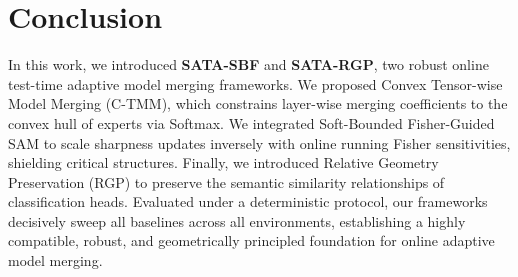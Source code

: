 \documentclass{article}
\begin{document}
\section{Conclusion}
\label{sec:conclusion}
In this work, we introduced \textbf{SATA-SBF} and \textbf{SATA-RGP}, two robust online test-time adaptive model merging frameworks. We proposed Convex Tensor-wise Model Merging (C-TMM), which constrains layer-wise merging coefficients to the convex hull of experts via Softmax. We integrated Soft-Bounded Fisher-Guided SAM to scale sharpness updates inversely with online running Fisher sensitivities, shielding critical structures. Finally, we introduced Relative Geometry Preservation (RGP) to preserve the semantic similarity relationships of classification heads. Evaluated under a deterministic protocol, our frameworks decisively sweep all baselines across all environments, establishing a highly compatible, robust, and geometrically principled foundation for online adaptive model merging.

\clearpage

\nocite{*}


\end{document}
